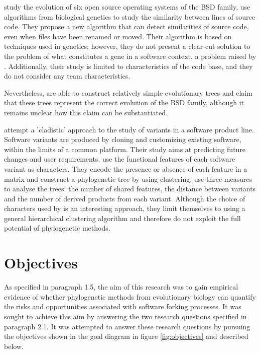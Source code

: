 \citet{Tenev2012a} study the evolution of six open source operating systems of the BSD family. \citet{Tenev2012a} use algorithms from biological genetics to study the similarity between lines of source code. They propose a new algorithm that can detect similarities of source code, even when files have been renamed or moved. Their algorithm is based on techniques used in genetics; however, they do not present a clear-cut solution to the problem of what constitutes a gene in a software context, a problem raised by \citet{Nehaniv2006a}. Additionally, their study is limited to characteristics of the code base, and they do not consider any team characteristics.

Nevertheless, \citet{Tenev2012a} are able to construct relatively simple evolutionary trees and claim that these trees represent the correct evolution of the BSD family, although it remains unclear how this claim can be substantiated.

\citet{Benlarabi2015b} attempt a 'cladistic' approach to the study of variants in a software product line. Software variants are produced by cloning and customizing existing software, within the limits of a common platform. Their study aims at predicting future changes and user requirements. \citet{Benlarabi2015b} use the functional features of each software variant as characters. They encode the presence or absence of each feature in a matrix and construct a phylogenetic tree by using clustering. \citet{Benlarabi2015b} use three measures to analyse the trees: the number of shared features, the distance between variants and the number of derived products from each variant. Although the choice of characters used by \citet{Benlarabi2015b} is an interesting approach, they limit themselves to using a general hierarchical clustering algorithm and therefore do not exploit the full potential of phylogenetic methods.


\section{Objectives}

As specified in paragraph 1.5, the aim of this research was to gain empirical evidence of whether phylogenetic methods from evolutionary biology can quantify the risks and opportunities associated with software forking processes. It was sought to achieve this aim by answering the two research questions specified in paragraph 2.1. It was attempted to answer these research questions by pursuing the objectives shown in the goal diagram in figure \ref{fig:objectives} and described below.


